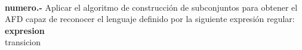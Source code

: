 \paragraph{}
\textbf{{numero}.-} Aplicar el algoritmo de construcción de subconjuntos para obtener el AFD capaz de reconocer el lenguaje definido por la siguiente expresión regular: \textbf{{expresion}} \\

{transicion}